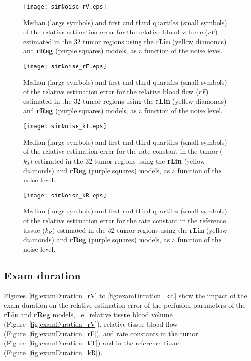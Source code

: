 \begin{subfigures}
    \begin{figure}\centering
        \texttt{[image: simNoise\_rV.eps]}
        \caption{Median (large symbols) and first and third quartiles (small symbols) of the relative estimation error for the relative blood volume ($rV$) estimated in the 32 tumor regions using the \textbf{rLin} (yellow diamonds) and \textbf{rReg} (purple squares) models, as a function of the noise level.}
        \label{fig:noise_rV}
    \end{figure}
    \begin{figure}\centering
        \texttt{[image: simNoise\_rF.eps]}
        \caption{Median (large symbols) and first and third quartiles (small symbols) of the relative estimation error for the relative blood flow ($rF$) estimated in the 32 tumor regions using the \textbf{rLin} (yellow diamonds) and \textbf{rReg} (purple squares) models, as a function of the noise level.}
        \label{fig:noise_rF}
    \end{figure}
    \begin{figure}\centering
        \texttt{[image: simNoise\_kT.eps]}
        \caption{Median (large symbols) and first and third quartiles (small symbols) of the relative estimation error for the rate constant in the tumor ($k_T$) estimated in the 32 tumor regions using the \textbf{rLin} (yellow diamonds) and \textbf{rReg} (purple squares) models, as a function of the noise level.}
        \label{fig:noise_kT}
    \end{figure}
    \begin{figure}\centering
        \texttt{[image: simNoise\_kR.eps]}
        \caption{Median (large symbols) and first and third quartiles (small symbols) of the relative estimation error for the rate constant in the reference tissue ($k_R$) estimated in the 32 tumor regions using the \textbf{rLin} (yellow diamonds) and \textbf{rReg} (purple squares) models, as a function of the noise level.}
        \label{fig:noise_kR}
    \end{figure}
\end{subfigures}
\FloatBarrier

\subsection{Exam duration}
Figures~\ref{fig:examDuration_rV} to \ref{fig:examDuration_kR} show the impact of the exam duration on the relative estimation error of the perfusion parameters of the \textbf{rLin} and \textbf{rReg} models, i.e.~relative tissue blood volume (Figure~\ref{fig:examDuration_rV}), relative tissue blood flow (Figure~\ref{fig:examDuration_rF}), and rate constants in the tumor (Figure~\ref{fig:examDuration_kT}) and in the reference tissue (Figure~\ref{fig:examDuration_kR}).

